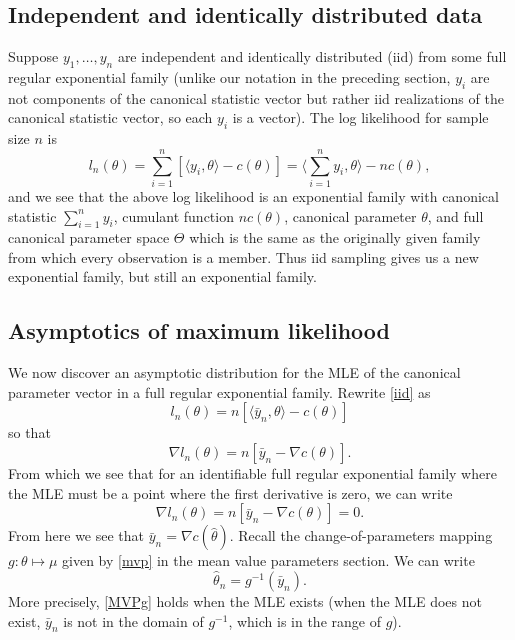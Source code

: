 \documentclass[
]{article}
\begin{document}
\hypertarget{independent-and-identically-distributed-data}{%
\subsection{Independent and identically distributed
data}\label{independent-and-identically-distributed-data}}

Suppose \(y_1, \ldots, y_n\) are independent and identically distributed
(iid) from some full regular exponential family (unlike our notation in
the preceding section, \(y_i\) are not components of the canonical
statistic vector but rather iid realizations of the canonical statistic
vector, so each \(y_i\) is a vector). The log likelihood for sample size
\(n\) is \begin{equation} \label{iid}
    l_n(\theta) = \sum_{i=1}^n\left[\langle y_i,\theta \rangle - c(\theta)\right]
      = \langle \sum_{i=1}^n y_i, \theta \rangle - n c(\theta),
\end{equation} and we see that the above log likelihood is an
exponential family with canonical statistic \(\sum_{i=1}^n y_i\),
cumulant function \(n c(\theta)\), canonical parameter \(\theta\), and
full canonical parameter space \(\Theta\) which is the same as the
originally given family from which every observation is a member. Thus
iid sampling gives us a new exponential family, but still an exponential
family.

\hypertarget{asymptotics-of-maximum-likelihood}{%
\subsection{Asymptotics of maximum
likelihood}\label{asymptotics-of-maximum-likelihood}}

We now discover an asymptotic distribution for the MLE of the canonical
parameter vector in a full regular exponential family. Rewrite
\eqref{iid} as \[
  l_n(\theta) = n\left[\langle \bar y_n, \theta \rangle - c(\theta)\right]
\] so that \[
  \nabla l_n(\theta) = n\left[\bar y_n - \nabla c(\theta)\right].
\] From which we see that for an identifiable full regular exponential
family where the MLE must be a point where the first derivative is zero,
we can write \[
    \nabla l_n(\theta) = n\left[\bar y_n - \nabla c(\theta)\right] = 0.
\] From here we see that \(\bar y_n = \nabla c(\hat\theta)\). Recall the
change-of-parameters mapping \(g:\theta \mapsto \mu\) given by
\eqref{mvp} in the mean value parameters section. We can write
\begin{equation} \label{MVPg}
  \hat\theta_n = g^{-1}(\bar y_n).
\end{equation} More precisely, \eqref{MVPg} holds when the MLE exists
(when the MLE does not exist, \(\bar y_n\) is not in the domain of
\(g^{-1}\), which is in the range of \(g\)).
\end{document}
